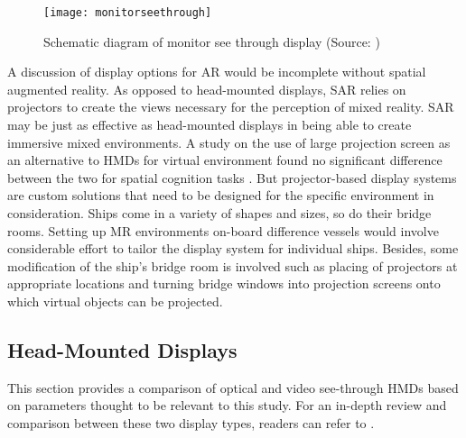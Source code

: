 \begin{figure}
	\centering
	\texttt{[image: monitorseethrough]}
	\caption{Schematic diagram of monitor see through display (Source: \cite{azuma1997survey})}
	\label{fig:monitorseethrough}
\end{figure}

A discussion of display options for AR would be incomplete without spatial augmented reality. As opposed to head-mounted displays, SAR relies on projectors to create the views necessary for the perception of mixed reality. SAR may be just as effective as head-mounted displays in being able to create immersive mixed environments. A study on the use of large projection screen as an alternative to HMDs for virtual environment found no significant difference between the two for spatial cognition tasks \parencite{patrick2000using}. But projector-based display systems are custom solutions that need to be designed for the specific environment in consideration. Ships come in a variety of shapes and sizes, so do their bridge rooms. Setting up MR environments on-board difference vessels would involve considerable effort to tailor the display system for individual ships. Besides, some modification of the ship's bridge room is involved such as placing of projectors at appropriate locations and turning bridge windows into projection screens onto which virtual objects can be projected.

\subsection{Head-Mounted Displays}
This section provides a comparison of optical and video see-through HMDs based on parameters thought to be relevant to this study. For an in-depth review and comparison between these two display types, readers can refer to \cite{rolland1995comparison}.

